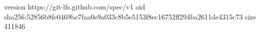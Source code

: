 version https://git-lfs.github.com/spec/v1
oid sha256:52856b8fe0469be7faa0e9a033c8b5e5153f8ec16752ff294ba2611de4315c73
size 411846
